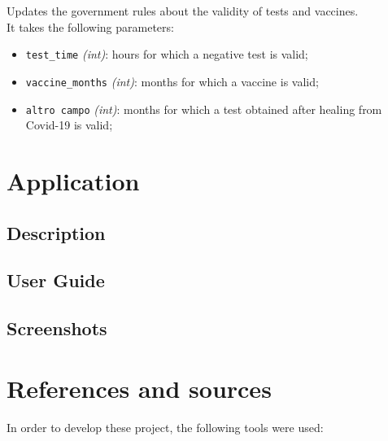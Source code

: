 \documentclass[12pt, a4paper]{article}
\begin{document}
\noindent
Updates the government rules about the validity of tests and vaccines. \\
It takes the following parameters:
\begin{itemize}
    \item \texttt{test\_time} \emph{(int)}: hours for which a negative test is valid;
    \item \texttt{vaccine\_months} \emph{(int)}: months for which a vaccine is valid;
    \item \texttt{altro campo} \emph{(int)}: months for which a test obtained after healing from Covid-19 is valid; 
 \end{itemize}

\clearpage

\section{Application}

\subsection{Description}

\blindtext

\subsection{User Guide}

\blindtext

\clearpage %

\subsection{Screenshots}

\blindtext

\clearpage 

\section{References and sources}

In order to develop these project, the following tools were used:
\end{document}

